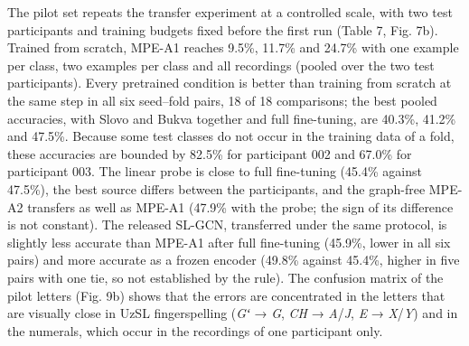 The pilot set repeats the transfer experiment at a controlled scale, with two test participants and training budgets fixed before the first run (Table 7, Fig. 7b). Trained from scratch, MPE-A1 reaches 9.5\%, 11.7\% and 24.7\% with one example per class, two examples per class and all recordings (pooled over the two test participants). Every pretrained condition is better than training from scratch at the same step in all six seed--fold pairs, 18 of 18 comparisons; the best pooled accuracies, with Slovo and Bukva together and full fine-tuning, are 40.3\%, 41.2\% and 47.5\%. Because some test classes do not occur in the training data of a fold, these accuracies are bounded by 82.5\% for participant 002 and 67.0\% for participant 003. The linear probe is close to full fine-tuning (45.4\% against 47.5\%), the best source differs between the participants, and the graph-free MPE-A2 transfers as well as MPE-A1 (47.9\% with the probe; the sign of its difference is not constant). The released SL-GCN, transferred under the same protocol, is slightly less accurate than MPE-A1 after full fine-tuning (45.9\%, lower in all six pairs) and more accurate as a frozen encoder (49.8\% against 45.4\%, higher in five pairs with one tie, so not established by the rule). The confusion matrix of the pilot letters (Fig. 9b) shows that the errors are concentrated in the letters that are visually close in UzSL fingerspelling (\emph{Gʻ} → \emph{G}, \emph{CH} → \emph{A}/\emph{J}, \emph{E} → \emph{X}/\emph{Y}) and in the numerals, which occur in the recordings of one participant only.

